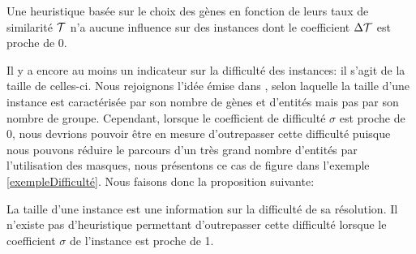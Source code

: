 \begin{proposition}
Une heuristique basée sur le choix des gènes en fonction de leurs taux de similarité $\cal{T}$ n'a aucune influence sur des instances dont le coefficient $\Delta\cal{T}$ est proche de 0.
\label{propDelta}
\end{proposition}

Il y a encore au moins un indicateur sur la difficulté des instances: il s'agit de la taille de celles-ci. Nous rejoignons l'idée émise dans \cite{Chhel2013}, selon laquelle la taille d'une instance est caractérisée par son nombre de gènes et d'entités mais pas par son nombre de groupe. Cependant, lorsque le coefficient de difficulté $\sigma$ est proche de 0, nous devrions pouvoir être en mesure d'outrepasser cette difficulté puisque nous pouvons réduire le parcours d'un très grand nombre d'entités par l'utilisation des masques, nous présentons ce cas de figure dans l'exemple \ref{exempleDifficulté}. Nous faisons donc la proposition suivante:



\begin{proposition}
La taille d'une instance est une information sur la difficulté de sa résolution. Il n'existe pas d'heuristique permettant d'outrepasser cette difficulté lorsque le coefficient $\sigma$ de l'instance est proche de 1.
\end{proposition}

